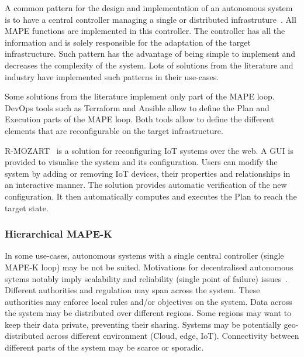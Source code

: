 \documentclass{article}
\begin{document}
A common pattern for the design and implementation of an autonomous system is to have a central controller managing a single or distributed infrastruture~\cite{garlan2004rainbow}. All MAPE functions are implemented in this controller. The controller has all the information and is solely responsible for the adaptation of the target infrastructure. Such pattern has the advantage of being simple to implement and decreases the complexity of the system. Lots of solutions from the literature and industry have implemented such patterns in their use-cases.

Some solutions from the literature implement only part of the MAPE loop. DevOps tools such as Terraform and Ansible allow to define the Plan and Execution parts of the MAPE loop. Both tools allow to define the different elements that are reconfigurable on the target infrastructure. 

R-MOZART~\cite{rmozart2021r} is a solution for reconfiguring IoT systems over the web. A GUI is provided to visualise the system and its configuration. Users can modify the system by adding or removing IoT devices, their properties and relationships in an interactive manner. The solution provides automatic verification of the new configuration. It then automatically computes and executes the Plan to reach the target state.

\subsubsection{Hierarchical MAPE-K}

In some use-cases, autonomous systems with a single central controller (\eg single MAPE-K loop) may be not be suited. Motivations for decentralised autonomous sytems notably imply scalability and reliability (\eg single point of failure) issues~\cite{quin2021mappingstudy}. 
Different authorities and regulation may span across the system. These authorities may enforce local rules and/or objectives on the system. Data across the system may be distributed over different regions. Some regions may want to keep their data private, preventing their sharing. Systems may be potentially geo-distributed across different environment (\eg Cloud, edge, IoT). Connectivity between different parts of the system may be scarce or sporadic. 
\end{document}
